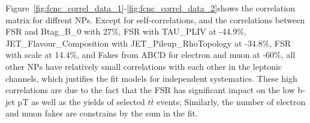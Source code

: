Figure~\ref{fig:fcnc_correl_data_1}-\ref{fig:fcnc_correl_data_2}shows the correlation matrix for diffrent NPs. Except for self-correlations, and the correlations between FSR and Btag\_B\_0 with 27\%, FSR with TAU\_PLIV at -44.9\%, JET\_Flavour\_Composition with JET\_Pileup\_RhoTopology at -34.8\%,   
FSR with scale at 14.4\%, and Fakes from ABCD for electron and muon at -60\%, all other NPs have relatively small correlations with each other in the leptonic channels, which justifies the fit models for independent systematics. These high correlations are due to the fact that the FSR has significant impact on the low b-jet pT as well as the yields of selected
$t\bar t$ events; Similarly, the number of electron and muon fakes are constrains by the sum in the fit.   



%
%









